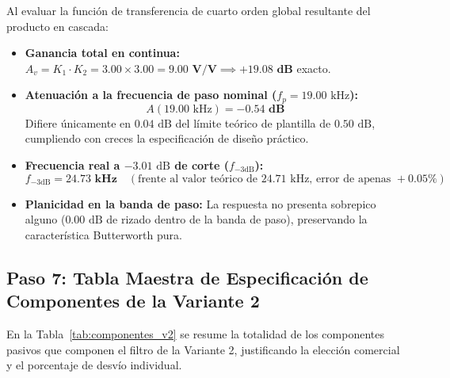 \documentclass[a4paper,11pt]{article}
\begin{document}
Al evaluar la función de transferencia de cuarto orden global resultante del producto en cascada:
\begin{itemize}
    \item \textbf{Ganancia total en continua:} $A_v = K_1 \cdot K_2 = 3.00 \times 3.00 = \mathbf{9.00\text{ V/V}} \implies \mathbf{+19.08\text{ dB}}$ exacto.
    \item \textbf{Atenuación a la frecuencia de paso nominal ($f_p = 19.00\text{ kHz}$):}
    \begin{equation}
    A(19.00\text{ kHz}) = \mathbf{-0.54\text{ dB}}
    \end{equation}
    Difiere únicamente en $0.04\text{ dB}$ del límite teórico de plantilla de $0.50\text{ dB}$, cumpliendo con creces la especificación de diseño práctico.
    \item \textbf{Frecuencia real a $-3.01\text{ dB}$ de corte ($f_{-3\text{dB}}$):}
    \begin{equation}
    f_{-3\text{dB}} = \mathbf{24.73\text{ kHz}} \quad (\text{frente al valor teórico de } 24.71\text{ kHz, error de apenas } +0.05\%)
    \end{equation}
    \item \textbf{Planicidad en la banda de paso:} La respuesta no presenta sobrepico alguno ($0.00\text{ dB}$ de rizado dentro de la banda de paso), preservando la característica Butterworth pura.
\end{itemize}

\subsection{Paso 7: Tabla Maestra de Especificación de Componentes de la Variante 2}
En la Tabla~\ref{tab:componentes_v2} se resume la totalidad de los componentes pasivos que componen el filtro de la Variante 2, justificando la elección comercial y el porcentaje de desvío individual.
\end{document}
